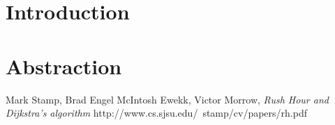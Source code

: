 \documentclass[10pt, a4paper]{article}
\begin{document}
\section{Introduction}
\section{Abstraction}

\begin{thebibliography}
    Mark Stamp, Brad Engel McIntosh Ewekk, Victor Morrow,
    \emph{Rush Hour and Dijkstra's algorithm}
    http://www.cs.sjsu.edu/~stamp/cv/papers/rh.pdf

\end{thebibliography}
\end{document}
